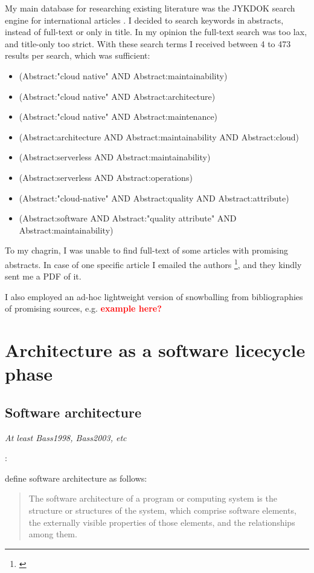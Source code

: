 \documentclass[utf8,english]{gradu3}
\newcommand{\todo}[1]{\textbf{\textcolor{red}{#1}}}
\newcommand{\tmp}[1]{\textit{{#1}}}
\begin{document}
My main database for researching existing literature was the JYKDOK search engine for international articles \parencite{JYKDOK}.
I decided to search keywords in abstracts, instead of full-text or only in title.
In my opinion the full-text search was too lax, and title-only too strict.
With these search terms I received between 4 to 473 results per search, which was sufficient:
\begin{itemize}
  \item (Abstract:"cloud native" AND Abstract:maintainability)
  \item (Abstract:"cloud native" AND Abstract:architecture)
  \item (Abstract:"cloud native" AND Abstract:maintenance)
  \item (Abstract:architecture AND Abstract:maintainability AND Abstract:cloud)
  \item (Abstract:serverless AND Abstract:maintainability)
  \item (Abstract:serverless AND Abstract:operations)
  \item (Abstract:"cloud-native" AND Abstract:quality AND Abstract:attribute)
  \item (Abstract:software AND Abstract:"quality attribute" AND Abstract:maintainability)
\end{itemize}

To my chagrin, I was unable to find full-text of some articles with promising abstracts.
In case of one specific article I emailed the authors \footnote{\textcite{Bogner2018}}, and they kindly sent me a PDF of it.

I also employed an ad-hoc lightweight version of snowballing from bibliographies of
promising sources, e.g. \todo{example here?}

\section{Architecture as a software licecycle phase}

\subsection{Software architecture}
\tmp{At least Bass1998, Bass2003, etc }

\parencite{Bass1998}:

\textcite{Bass1998} define software architecture as follows:

\begin{quote}
The software architecture of a program or computing system is the structure or structures of the system, which comprise software elements, the externally visible properties of those elements, and the relationships among them.
\end{quote}
\end{document}
